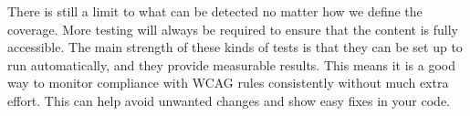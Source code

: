 \documentclass{master_thesis}
\begin{document}
There is still a limit to what can be detected no matter how we define the coverage. More testing will always be required to ensure that the content is fully accessible. The main strength of these kinds of tests is that they can be set up to run automatically, and they provide measurable results. This means it is a good way to monitor compliance with WCAG rules consistently without much extra effort. This can help avoid unwanted changes and show easy fixes in your code.

\end{document}
